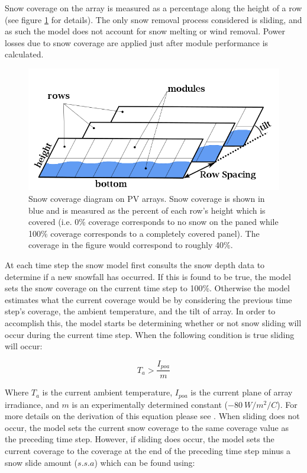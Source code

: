 \documentclass[12pt,letterpaper]{article}
\begin{document}
Snow coverage on the array is measured as a percentage along the height of a row (see figure \ref{fig-snowCoverage} for details). The only snow removal process considered is sliding, and as such the model does not account for snow melting or wind removal. Power losses due to snow coverage are applied just after module performance is calculated.

\begin{figure}
\begin{center}
\includegraphics[scale=0.5]{snow-coverage-diagram}
\caption{Snow coverage diagram on PV arrays. Snow coverage is shown in blue and is measured as the percent of each row's height which is covered (i.e. 0\% coverage corresponds to no snow on the paned while 100\% coverage corresponds to a completely covered panel). The coverage in the figure would correspond to roughly 40\%.}
\label{fig-snowCoverage}
\end{center}
\end{figure}

At each time step the snow model first consults the snow depth data to determine if a new snowfall has occurred. If this is found to be true, the model sets the snow coverage on the current time step to 100\%. Otherwise the model estimates what the current coverage would be by considering the previous time step's coverage, the ambient temperature, and the tilt of array. In order to accomplish this, the model starts be determining whether or not snow sliding will occur during the current time step. When the following condition is true sliding will occur:

\begin{equation}
	T_a > \frac{I_{poa}}{m}
	\label{eqn-snowSlidingCondition}
\end{equation}

Where $T_a$ is the current ambient temperature, $I_{poa}$ is the current plane of array irradiance, and $m$ is an experimentally determined constant ($-80\ W/m^2/C$). For more details on the derivation of this equation please see \citet{marion-snowmodel}. When sliding does not occur, the model sets the current snow coverage to the same coverage value as the preceding time step. However, if sliding does occur, the model sets the current coverage to the coverage at the end of the preceding time step minus a snow slide amount ($s.s.a$) which can be found using:
\end{document}
